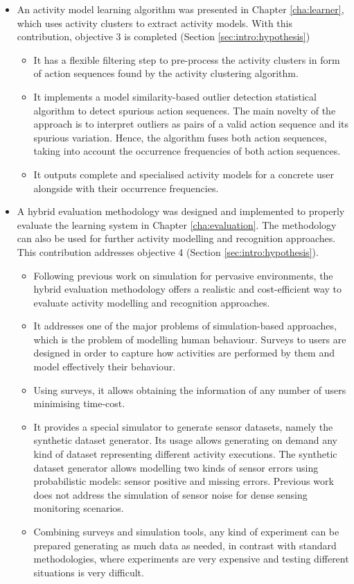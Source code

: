 \begin{itemize}
 \item An activity model learning algorithm was presented in Chapter \ref{cha:learner}, which uses activity clusters to extract activity models. With this contribution, objective 3 is completed (Section \ref{sec:intro:hypothesis})  %
 \begin{itemize}
  \item It has a flexible filtering step to pre-process the activity clusters in form of action sequences found by the activity clustering algorithm.
  \item It implements a model similarity-based outlier detection statistical algorithm to detect spurious action sequences. The main novelty of the approach is to interpret outliers as pairs of a valid action sequence and its spurious variation. Hence, the algorithm fuses both action sequences, taking into account the occurrence frequencies of both action sequences.
  \item It outputs complete and specialised activity models for a concrete user alongside with their occurrence frequencies.
 \end{itemize}

 \item A hybrid evaluation methodology was designed and implemented to properly evaluate the learning system in Chapter \ref{cha:evaluation}. The methodology can also be used for further activity modelling and recognition approaches. This contribution addresses objective 4 (Section \ref{sec:intro:hypothesis}). %
 \begin{itemize}
  \item Following previous work on simulation for pervasive environments, the hybrid evaluation methodology offers a realistic and cost-efficient way to evaluate activity modelling and recognition approaches.
  \item It addresses one of the major problems of simulation-based approaches, which is the problem of modelling human behaviour. Surveys to users are designed in order to capture how activities are performed by them and model effectively their behaviour.
  \item Using surveys, it allows obtaining the information of any number of users minimising time-cost.
  \item It provides a special simulator to generate sensor datasets, namely the synthetic dataset generator. Its usage allows generating on demand any kind of dataset representing different activity executions. The synthetic dataset generator allows modelling two kinds of sensor errors using probabilistic models: sensor positive and missing errors. Previous work does not address the simulation of sensor noise for dense sensing monitoring scenarios.
  \item Combining surveys and simulation tools, any kind of experiment can be prepared generating as much data as needed, in contrast with standard methodologies, where experiments are very expensive and testing different situations is very difficult.
 \end{itemize}

\end{itemize}
